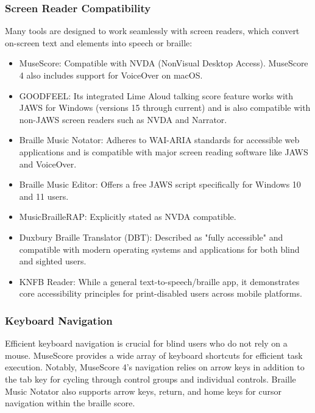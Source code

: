 \subsubsection{Screen Reader Compatibility}
Many tools are designed to work seamlessly with screen readers, which convert on-screen text and elements into speech or braille:
\begin{itemize}
    \item MuseScore: Compatible with NVDA (NonVisual Desktop Access). \cite{soundwithoutsight-musescore, musescore-braille} MuseScore 4 also includes support for VoiceOver on macOS. \cite{daisy-musicxml}
    \item GOODFEEL: Its integrated Lime Aloud talking score feature works with JAWS for Windows (versions 15 through current) and is also compatible with non-JAWS screen readers such as NVDA and Narrator. \cite{dancingdots-goodfeel, canasstech-limealoud}
    \item Braille Music Notator: Adheres to WAI-ARIA standards for accessible web applications and is compatible with major screen reading software like JAWS and VoiceOver. \cite{braillemusicnotator}
    \item Braille Music Editor: Offers a free JAWS script specifically for Windows 10 and 11 users. \cite{braillemusiceditor}
    \item MusicBrailleRAP: Explicitly stated as NVDA compatible. \cite{github-braillerap}
    \item Duxbury Braille Translator (DBT): Described as "fully accessible" and compatible with modern operating systems and applications for both blind and sighted users. \cite{duxbury-brochure}
    \item KNFB Reader: While a general text-to-speech/braille app, it demonstrates core accessibility principles for print-disabled users across mobile platforms. \cite{knfbreader}
\end{itemize}

\subsubsection{Keyboard Navigation}
Efficient keyboard navigation is crucial for blind users who do not rely on a mouse. MuseScore provides a wide array of keyboard shortcuts for efficient task execution. \cite{musescore-braille, musescore-braille} Notably, MuseScore 4's navigation relies on arrow keys in addition to the tab key for cycling through control groups and individual controls. \cite{musescore-accessibility} Braille Music Notator also supports arrow keys, return, and home keys for cursor navigation within the braille score. \cite{braillemusicnotator-quickstart}


